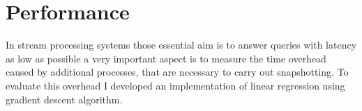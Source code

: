 \cite{abs}

\section{Performance}
In stream processing systems those essential aim is to answer queries with latency as low as possible a very important aspect is to measure the time overhead caused by  additional processes, that are necessary to carry out snapshotting. To evaluate this overhead I developed an implementation of linear regression using gradient descent
algorithm.
